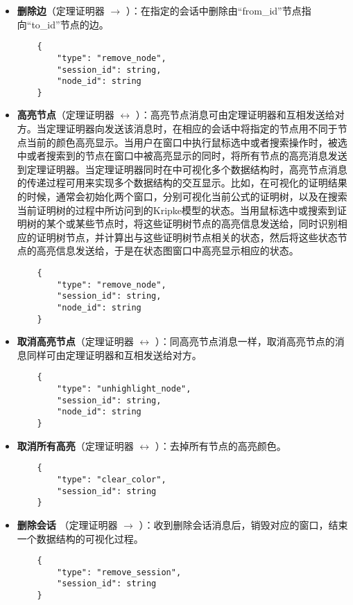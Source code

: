 \begin{itemize}
\begin{verbatim}
	    "from_id": string,
	    "to_id": string,
	    "label": string
	}
	\end{verbatim}
	\item \textbf{删除边}（定理证明器 $\longrightarrow$ ）：在指定的会话中删除由“from\_id”节点指向“to\_id”节点的边。
	\begin{verbatim}
	{
	    "type": "remove_node",
	    "session_id": string,
	    "node_id": string
	}
	\end{verbatim}
	\item \textbf{高亮节点}（定理证明器 $\longleftrightarrow$ ）：高亮节点消息可由定理证明器和互相发送给对方。当定理证明器向发送该消息时，在相应的会话中将指定的节点用不同于节点当前的颜色高亮显示。当用户在窗口中执行鼠标选中或者搜索操作时，被选中或者搜索到的节点在窗口中被高亮显示的同时，将所有节点的高亮消息发送到定理证明器。当定理证明器同时在中可视化多个数据结构时，高亮节点消息的传递过程可用来实现多个数据结构的交互显示。比如，在可视化\sctlprov{}的证明结果的时候，通常会初始化两个窗口，分别可视化当前公式的证明树，以及在搜索当前证明树的过程中所访问到的Kripke模型的状态。当用鼠标选中或搜索到证明树的某个或某些节点时，将这些证明树节点的高亮信息发送给\sctlprov{}，同时\sctlprov{}识别相应的证明树节点，并计算出与这些证明树节点相关的状态，然后将这些状态节点的高亮信息发送给，于是在状态图窗口中高亮显示相应的状态。
	
	\begin{verbatim}
	{
	    "type": "remove_node",
	    "session_id": string,
	    "node_id": string
	}
	\end{verbatim}
	\item \textbf{取消高亮节点}（定理证明器 $\longleftrightarrow$ ）：同高亮节点消息一样，取消高亮节点的消息同样可由定理证明器和互相发送给对方。
	\begin{verbatim}
	{
	    "type": "unhighlight_node",
	    "session_id": string,
	    "node_id": string
	}
	\end{verbatim}
	\item \textbf{取消所有高亮}（定理证明器 $\longleftrightarrow$ ）：去掉所有节点的高亮颜色。
	\begin{verbatim}
	{
	    "type": "clear_color",
	    "session_id": string
	}
	\end{verbatim}
	\item \textbf{删除会话} （定理证明器 $\longrightarrow$ ）：收到删除会话消息后，销毁对应的窗口，结束一个数据结构的可视化过程。
	\begin{verbatim}
	{
	    "type": "remove_session",
	    "session_id": string
	}
	\end{verbatim}
\end{itemize}

